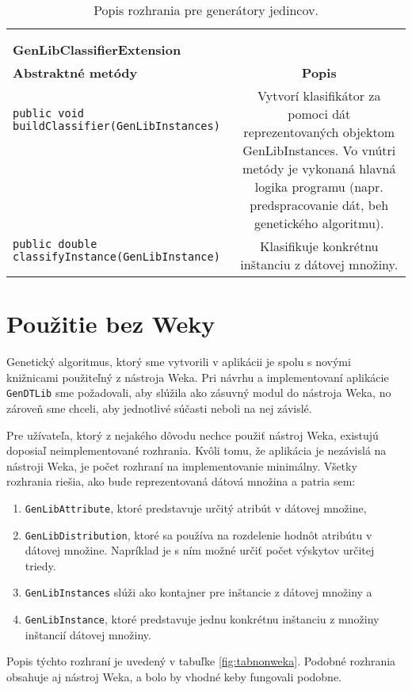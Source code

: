 \begin{table}
\begin{tabular}{|l|c|}
& \\ 
& \\ 
\hline
\hline
\textbf{GenLibClassifierExtension} & \\
\hline\hline
\textbf{Abstraktné metódy} & \textbf{Popis} \\
\hline
\verb|public void buildClassifier(GenLibInstances)| & \multirow{8}{5cm}{Vytvorí klasifikátor za pomoci dát reprezentovaných objektom GenLibInstances. Vo vnútri metódy je vykonaná hlavná logika programu (napr. predspracovanie dát, beh genetického algoritmu).} \\
& \\
& \\
& \\ 
& \\ 
& \\ 
& \\ 
& \\ 
\hline
\verb|public double classifyInstance(GenLibInstance)| & \multirow{3}{5cm}{Klasifikuje konkrétnu inštanciu z dátovej množiny.} \\
& \\ 
& \\ 
\hline
\hline
\end{tabular}
\caption{Popis rozhrania pre generátory jedincov.}\label{fig:tabclass}
\end{table}
\section{Použitie bez Weky}
Genetický algoritmus, ktorý sme vytvorili v aplikácii je spolu s novými knižnicami použiteľný z nástroja Weka. Pri návrhu a implementovaní aplikácie \verb|GenDTLib| sme požadovali, aby slúžila ako zásuvný modul do nástroja Weka, no zároveň sme chceli, aby jednotlivé súčasti neboli na nej závislé. 

Pre užívateľa, ktorý z nejakého dôvodu nechce použiť nástroj Weka, existujú doposiaľ neimplementované rozhrania. Kvôli tomu, že aplikácia je nezávislá na nástroji Weka, je počet rozhraní na implementovanie minimálny. Všetky rozhrania riešia, ako bude reprezentovaná dátová množina a patria sem:
\begin{enumerate}
\item \verb|GenLibAttribute|, ktoré predstavuje určitý atribút v dátovej množine,
\item \verb|GenLibDistribution|, ktoré sa používa na rozdelenie hodnôt atribútu v dátovej množine. Napríklad je s ním možné určiť počet výskytov určitej triedy.
\item \verb|GenLibInstances| slúži ako kontajner pre inštancie z dátovej množiny a
\item \verb|GenLibInstance|, ktoré predstavuje jednu konkrétnu inštanciu z množiny inštancií dátovej množiny.
\end{enumerate}
Popis týchto rozhraní je uvedený v tabuľke \ref{fig:tabnonweka}. Podobné rozhrania obsahuje aj nástroj Weka, a bolo by vhodné keby fungovali podobne.


